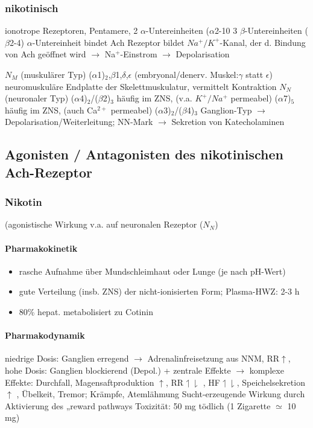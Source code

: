 \documentclass[10pt,a4paper]{report}
\begin{document}
\subsubsection{nikotinisch}	
ionotrope Rezeptoren, Pentamere, 
2 $\alpha$-Untereinheiten ($\alpha$2-10
3 $\beta$-Untereinheiten ($\beta$2-4)
$\alpha$-Untereinheit bindet Ach
Rezeptor bildet $Na^+/K^+$-Kanal, 
der d. Bindung von Ach geöffnet wird 
$\rightarrow$ Na$^+$-Einstrom $\rightarrow$ Depolarisation 
 
$N_M$ 	(muskulärer Typ)
($\alpha$1)$_2$,$\beta$1,$\delta$,$\epsilon$ (embryonal/denerv. Muskel:$\gamma$ statt $\epsilon$)
neuromuskuläre Endplatte der Skelettmuskulatur, vermittelt Kontraktion	
$N_N$ 	(neuronaler Typ)
($\alpha$4)$_2$/($\beta$2)$_3$ 	häufig im ZNS, (v.a. $K^+/Na^+$ permeabel)
($\alpha$7)$_5$ 	häufig im ZNS, (auch Ca$^{2+}$ permeabel)
($\alpha$3)$_2$/($\beta$4)$_3$ Ganglion-Typ $\rightarrow$ Depolarisation/Weiterleitung; 
NN-Mark $\rightarrow$ Sekretion von Katecholaminen
\subsection{Agonisten / Antagonisten des nikotinischen Ach-Rezeptor}
\subsubsection{Nikotin}(agonistische Wirkung v.a. auf neuronalen Rezeptor ($N_N$) \\
\paragraph{Pharmakokinetik}
\begin{itemize}
	\item rasche Aufnahme über Mundschleimhaut oder Lunge (je nach pH-Wert)
    \item gute Verteilung (insb. ZNS) der nicht-ionisierten Form; Plasma-HWZ: 2-3 h
    \item 80\% hepat. metabolisiert zu Cotinin
\end{itemize}
\paragraph{Pharmakodynamik}
 niedrige Dosis: Ganglien  erregend $\rightarrow$ Adrenalinfreisetzung aus NNM, RR$\uparrow$, hohe Dosis: Ganglien blockierend (Depol.) + zentrale Effekte
$\rightarrow$ komplexe Effekte: Durchfall, Magensaftproduktion $\uparrow$, RR$	\upharpoonleft\downharpoonright$ , HF$	\upharpoonleft\downharpoonright$, Speichelsekretion $\uparrow$ , Übelkeit, Tremor; Krämpfe, Atemlähmung Sucht-erzeugende Wirkung durch Aktivierung des „reward pathways Toxizität: 50 mg tödlich (1 Zigarette $\simeq$ 10 mg)
\end{document}
